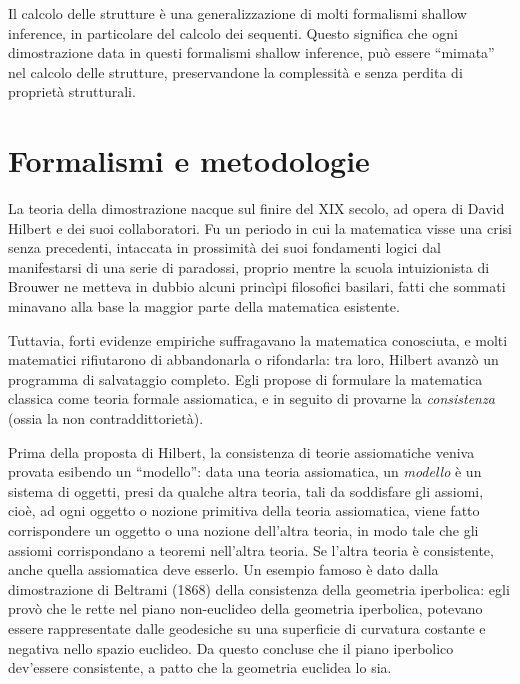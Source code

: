 \documentclass[12pt,a4paper,openright,twoside]{report}
\begin{document}
Il calcolo delle strutture \`e una generalizzazione di molti formalismi shallow inference, in particolare del calcolo dei sequenti. Questo significa che ogni dimostrazione data in questi formalismi shallow inference, pu\`o essere ``mimata'' nel calcolo delle strutture, preservandone la complessit\`a e senza perdita di propriet\`a strutturali.

\clearpage{\pagestyle{empty}\cleardoublepage}
\tableofcontents
\rhead[\fancyplain{}{\bfseries\leftmark}]{\fancyplain{}{\bfseries\thepage}}
\clearpage{\pagestyle{empty}\cleardoublepage}

\listoffigures
\clearpage{\pagestyle{empty}\cleardoublepage}


\chapter{Formalismi e metodologie}
\lhead[\fancyplain{}{\bfseries\thepage}]{\fancyplain{}{\bfseries\rightmark}}


La teoria della dimostrazione nacque sul finire del XIX secolo, ad opera di David Hilbert e dei suoi collaboratori. Fu un periodo in cui la matematica visse una crisi senza precedenti, intaccata in prossimit\`a dei suoi fondamenti logici dal manifestarsi di una serie di paradossi, proprio mentre la scuola intuizionista di Brouwer ne metteva in dubbio alcuni princ\`ipi filosofici basilari, fatti che sommati minavano alla base la maggior parte della matematica esistente. 

Tuttavia, forti evidenze empiriche suffragavano la matematica conosciuta, e molti matematici rifiutarono di abbandonarla o rifondarla: tra loro, Hilbert avanz\`o un programma di salvataggio completo. Egli propose di formulare la matematica classica come teoria formale assiomatica, e in seguito di provarne la \emph{consistenza} (ossia la non contraddittoriet\`a).

Prima della proposta di Hilbert, la consistenza di teorie assiomatiche veniva provata esibendo un ``modello'': data una teoria assiomatica, un \emph{modello} \`e un sistema di oggetti, presi da qualche altra teoria, tali da soddisfare gli assiomi, cio\`e, ad ogni oggetto o nozione primitiva della teoria assiomatica, viene fatto corrispondere un oggetto o una nozione dell'altra teoria, in modo tale che gli assiomi corrispondano a teoremi nell'altra teoria. Se l'altra teoria \`e consistente, anche quella assiomatica deve esserlo. Un esempio famoso \`e dato dalla dimostrazione di Beltrami (1868) della consistenza della geometria iperbolica: egli prov\`o che le rette nel piano non-euclideo della geometria iperbolica, potevano essere rappresentate dalle geodesiche su una superficie di curvatura costante e negativa nello spazio euclideo. Da questo concluse che il piano iperbolico dev'essere consistente, a patto che la geometria euclidea lo sia.
\end{document}
